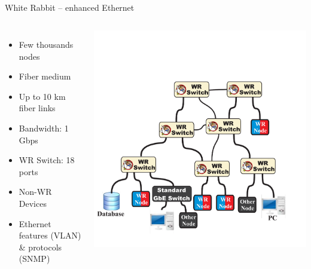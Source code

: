 \documentclass[compress,red]{beamer}
\begin{document}
\subsection{}
\begin{frame}{White Rabbit -- enhanced Ethernet}

\begin{columns}[c]
 

  \begin{itemize}
    \item Few thousands nodes
    \item Fiber medium
    \item Up to 10 km fiber links
    \item Bandwidth: 1 Gbps
    \item WR Switch: 18 ports
    \item Non-WR Devices
    \item Ethernet features (VLAN) \& protocols (SNMP)
  \end{itemize}

    \begin{center}
    \includegraphics[width=1.0\textwidth]{network/WR_network-ethernet.pdf}
    

    \end{center}
\end{columns}

\end{frame}
\end{document}
